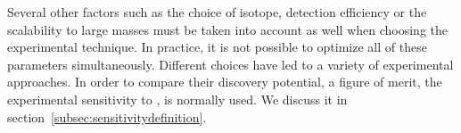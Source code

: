 % 

Several other factors such as the choice of isotope, detection efficiency or the scalability to large masses must be taken into account as well when choosing the experimental technique. In practice, it is not possible to optimize all of these parameters simultaneously. Different choices have led to a variety of experimental approaches. In order to compare their discovery potential, a figure of merit, the experimental sensitivity to \mbb, is normally used. We discuss it in section~\ref{subsec:sensitivitydefinition}. 

